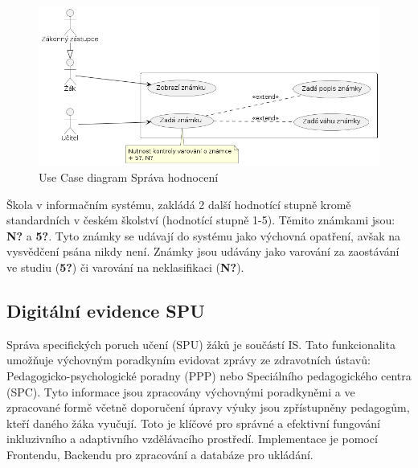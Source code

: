 \documentclass[FM,Proj]{tulthesis}
\begin{document}
\begin{figure}[H]
    \includegraphics[width=\textwidth-28pt]{uc-sprava-hodnoceni.png}
    \caption{Use Case diagram Správa hodnocení}
    \label{fig:uc-sprava-hodnoceni}
\end{figure}

Škola v informačním systému, zakládá 2 další hodnotící stupně kromě standardních 
v českém školství (hodnotící stupně 1-5). Těmito známkami jsou: \textbf{N?} 
a \textbf{5?}. Tyto známky se udávají do systému jako výchovná opatření,
avšak na vysvědčení psána nikdy není. Známky jsou udávány jako varování za 
zaostávání ve studiu (\textbf{5?}) či varování na neklasifikaci (\textbf{N?}).

\subsection*{Digitální evidence SPU}
Správa specifických poruch učení (SPU) žáků je součástí IS. Tato funkcionalita umožňuje
výchovným poradkyním evidovat zprávy ze zdravotních ústavů: Pedagogicko-psychologické 
poradny (PPP) nebo Speciálního pedagogického centra (SPC). Tyto informace
jsou zpracovány výchovnými poradkyněmi a ve zpracované formě včetně doporučení úpravy
výuky jsou zpřístupněny pedagogům, kteří daného žáka vyučují. Toto je klíčové pro
správné a efektivní fungování inkluzivního a adaptivního vzdělávacího prostředí.
Implementace je pomocí Frontendu, Backendu pro zpracování a databáze pro ukládání.
\end{document}
